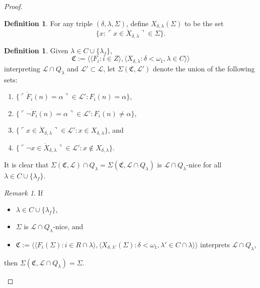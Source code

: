 \documentclass[12pt, twoside]{memoir}
\numberwithin{equation}{section}
\theoremstyle{definition}
\newtheorem{defi}[thm]{Definition}
\theoremstyle{remark}
\newtheorem{rem}[thm]{Remark}
\theoremstyle{definition}
\theoremstyle{definition}
\theoremstyle{definition}
\theoremstyle{remark}
\begin{document}
\begin{proof}
\begin{defi}
For any triple $(\delta, \lambda, \Sigma)$, define $X_{\delta, \lambda}(\Sigma)$ to be the set $$\{x : \ulcorner x \in \dot{X}_{\delta, \lambda} \urcorner \in \Sigma\}.$$
\end{defi}

\begin{defi}\label{def415}
Given $\lambda \in C \cup \{\lambda_f\}$, $$\mathfrak{C} := \langle \langle F_i : i \in Z \rangle, \langle X_{\delta, \lambda} : \delta < \omega_1, \lambda \in C \rangle \rangle$$
interpreting $\mathcal{L} \cap Q_{\lambda}$ and $\mathcal{L}' \subset \mathcal{L}$, let $\Sigma(\mathfrak{C}, \mathcal{L}')$ denote the union of the following sets:
\begin{enumerate}[label=(\alph*)]
    \item $\{\ulcorner \dot{F}_i (n) = \alpha \urcorner \in \mathcal{L}' : F_i (n) = \alpha\}$,
    \item $\{\ulcorner \neg \dot{F}_i (n) = \alpha \urcorner \in \mathcal{L}' : F_i (n) \neq \alpha\}$,
    \item $\{\ulcorner x \in \dot{X}_{\delta, \lambda} \urcorner \in \mathcal{L}' : x \in X_{\delta, \lambda}\}$, and
    \item $\{\ulcorner \neg x \in \dot{X}_{\delta, \lambda} \urcorner \in \mathcal{L}' : x \not\in X_{\delta, \lambda}\}$.
\end{enumerate}
It is clear that $\Sigma(\mathfrak{C}, \mathcal{L}) \cap Q_{\lambda} = \Sigma(\mathfrak{C}, \mathcal{L} \cap Q_{\lambda})$ is $\mathcal{L} \cap Q_{\lambda}$-nice for all $\lambda \in C \cup \{\lambda_f\}$.
\end{defi}

\begin{rem}\label{rem416}
If 
\begin{itemize}
    \item $\lambda \in C \cup \{\lambda_f\}$, 
    \item $\Sigma$ is $\mathcal{L} \cap Q_{\lambda}$-nice, and
    \item $\mathfrak{C} := \langle \langle F_i(\Sigma) : i \in R \cap \lambda \rangle, \langle X_{\delta, \lambda'}(\Sigma) : \delta < \omega_1, \lambda' \in C \cap \lambda \rangle \rangle$ interprets $\mathcal{L} \cap Q_{\lambda}$,
\end{itemize}
then $\Sigma(\mathfrak{C}, \mathcal{L} \cap Q_{\lambda}) = \Sigma$.
\end{rem}


\end{proof}
\end{document}
